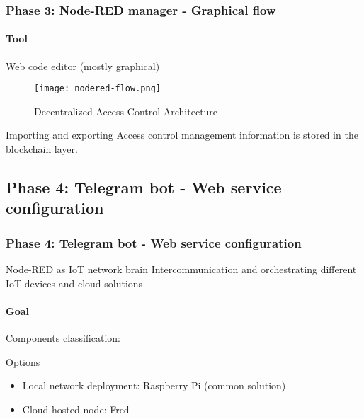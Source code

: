 \documentclass[
    aspectratio=169,                   %
]{beamer}
\begin{document}
    \begin{frame}
        \frametitle{Phase 3: Node-RED manager - Graphical flow}

        \paragraph{Tool} Web code editor (mostly graphical)

        \begin{figure}
            \centering
            \begin{stampbox}
                \texttt{[image: nodered-flow.png]}
            \end{stampbox}
            \caption{Decentralized Access Control Architecture}
        \end{figure}

        \begin{block}{Importing and exporting}
            Access control management information is stored in the blockchain layer.
        \end{block}
        
    \end{frame}

\subsection{Phase 4: Telegram bot - Web service configuration}

    \begin{frame}
        \frametitle{Phase 4: Telegram bot - Web service configuration}

        \begin{block}{Node-RED as IoT network brain}
            Intercommunication and orchestrating different IoT devices and cloud solutions
        \end{block}

        \paragraph{Goal} Components classification:

        \begin{block}{Options}
            \begin{itemize}
                \item \alert{Local network deployment}: Raspberry Pi (common solution)
                \item \alert{Cloud hosted node}: Fred
            \end{itemize}
        \end{block}

    \end{frame}
\end{document}
